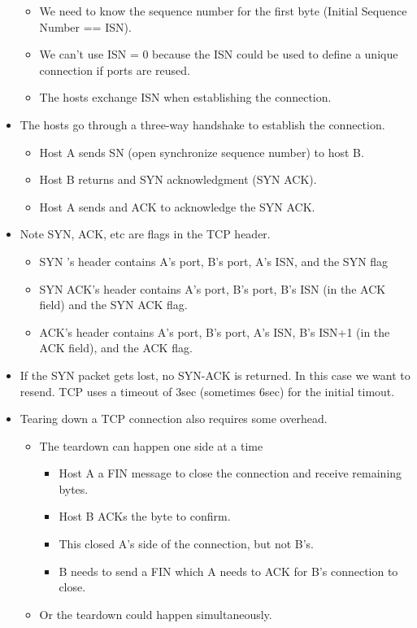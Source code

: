 \begin{itemize}
  \begin{itemize}
  \tightlist
  \item
    We need to know the sequence number for the first byte (Initial
    Sequence Number == ISN).
  \item
    We can't use ISN = 0 because the ISN could be used to define a
    unique connection if ports are reused.
  \item
    The hosts exchange ISN when establishing the connection.
  \end{itemize}
\item
  The hosts go through a three-way handshake to establish the
  connection.

  \begin{itemize}
  \tightlist
  \item
    Host A sends SN (open synchronize sequence number) to host B.
  \item
    Host B returns and SYN acknowledgment (SYN ACK).
  \item
    Host A sends and ACK to acknowledge the SYN ACK.
  \end{itemize}
\item
  Note SYN, ACK, etc are flags in the TCP header.

  \begin{itemize}
  \tightlist
  \item
    SYN 's header contains A's port, B's port, A's ISN, and the SYN flag
  \item
    SYN ACK's header contains A's port, B's port, B's ISN (in the ACK
    field) and the SYN \textbar{} ACK flag.
  \item
    ACK's header contains A's port, B's port, A's ISN, B's ISN+1 (in the
    ACK field), and the ACK flag.
  \end{itemize}
\item
  If the SYN packet gets lost, no SYN-ACK is returned. In this case we
  want to resend. TCP uses a timeout of 3sec (sometimes 6sec) for the
  initial timout.
\item
  Tearing down a TCP connection also requires some overhead.

  \begin{itemize}
  \tightlist
  \item
    The teardown can happen one side at a time

    \begin{itemize}
    \tightlist
    \item
      Host A a FIN message to close the connection and receive remaining
      bytes.
    \item
      Host B ACKs the byte to confirm.
    \item
      This closed A's side of the connection, but not B's.
    \item
      B needs to send a FIN which A needs to ACK for B's connection to
      close.
    \end{itemize}
  \item
    Or the teardown could happen simultaneously.


\end{itemize}
\end{itemize}
